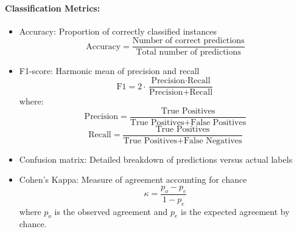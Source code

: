 \documentclass[12pt]{article}
\begin{document}
\paragraph{Classification Metrics:}
\begin{itemize}
    \item Accuracy: Proportion of correctly classified instances
    \begin{equation}
        \text{Accuracy} = \frac{\text{Number of correct predictions}}{\text{Total number of predictions}}
    \end{equation}
    
    \item F1-score: Harmonic mean of precision and recall
    \begin{equation}
        \text{F1} = 2 \cdot \frac{\text{Precision} \cdot \text{Recall}}{\text{Precision} + \text{Recall}}
    \end{equation}
    where:
    \begin{equation}
        \text{Precision} = \frac{\text{True Positives}}{\text{True Positives} + \text{False Positives}}
    \end{equation}
    \begin{equation}
        \text{Recall} = \frac{\text{True Positives}}{\text{True Positives} + \text{False Negatives}}
    \end{equation}
    
    \item Confusion matrix: Detailed breakdown of predictions versus actual labels
    
    \item Cohen's Kappa: Measure of agreement accounting for chance
    \begin{equation}
        \kappa = \frac{p_o - p_e}{1 - p_e}
    \end{equation}
    where $p_o$ is the observed agreement and $p_e$ is the expected agreement by chance.
\end{itemize}
\end{document}

